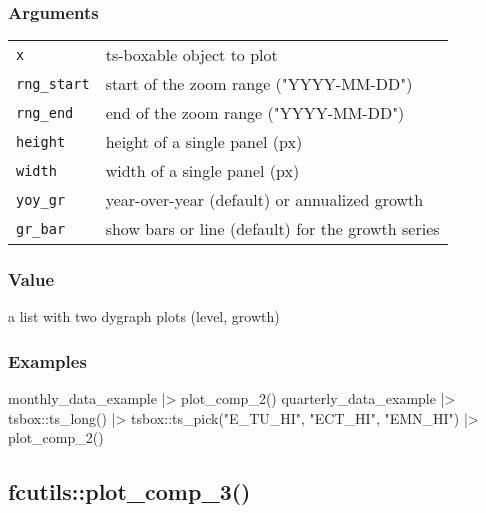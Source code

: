\documentclass[
  letterpaper,
  DIV=11,
  numbers=noendperiod]{scrreport}
\newenvironment{Shaded}{\begin{snugshade}}{\end{snugshade}}
\newcommand{\FunctionTok}[1]{\textcolor[rgb]{0.28,0.35,0.67}{#1}}
\newcommand{\NormalTok}[1]{\textcolor[rgb]{0.00,0.23,0.31}{#1}}
\newcommand{\SpecialCharTok}[1]{\textcolor[rgb]{0.37,0.37,0.37}{#1}}
\newcommand{\StringTok}[1]{\textcolor[rgb]{0.13,0.47,0.30}{#1}}
\begin{document}
\subsubsection{Arguments}\label{arguments-65}

\begin{longtable}[]{@{}ll@{}}
\toprule\noalign{}
\endhead
\bottomrule\noalign{}
\endlastfoot
\texttt{x} & ts-boxable object to plot \\
\texttt{rng\_start} & start of the zoom range ("YYYY-MM-DD") \\
\texttt{rng\_end} & end of the zoom range ("YYYY-MM-DD") \\
\texttt{height} & height of a single panel (px) \\
\texttt{width} & width of a single panel (px) \\
\texttt{yoy\_gr} & year-over-year (default) or annualized growth \\
\texttt{gr\_bar} & show bars or line (default) for the growth series \\
\end{longtable}

\subsubsection{Value}\label{value-63}

a list with two dygraph plots (level, growth)

\subsubsection{Examples}\label{examples-65}

\begin{Shaded}
\begin{Highlighting}[]
\NormalTok{monthly\_data\_example }\SpecialCharTok{|\textgreater{}}
  \FunctionTok{plot\_comp\_2}\NormalTok{()}
\NormalTok{quarterly\_data\_example }\SpecialCharTok{|\textgreater{}}
\NormalTok{  tsbox}\SpecialCharTok{::}\FunctionTok{ts\_long}\NormalTok{() }\SpecialCharTok{|\textgreater{}}
\NormalTok{  tsbox}\SpecialCharTok{::}\FunctionTok{ts\_pick}\NormalTok{(}\StringTok{"E\_TU\_HI"}\NormalTok{, }\StringTok{"ECT\_HI"}\NormalTok{, }\StringTok{"EMN\_HI"}\NormalTok{) }\SpecialCharTok{|\textgreater{}}
  \FunctionTok{plot\_comp\_2}\NormalTok{()}
\end{Highlighting}
\end{Shaded}

\subsection{fcutils::plot\_comp\_3()}\label{fcutilsplot_comp_3}
\end{document}
